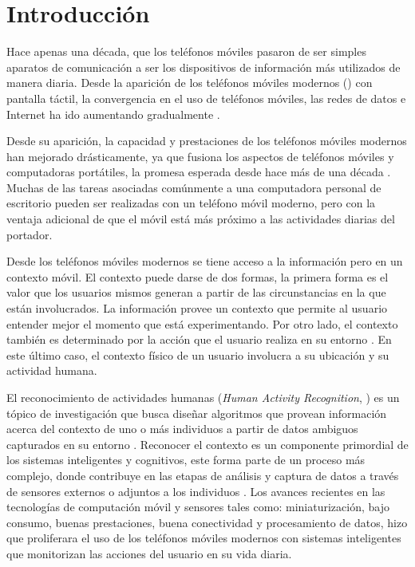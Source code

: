 
\chapter{Introducción}

\label{chap1:introduccion}

Hace apenas una década, que los teléfonos móviles pasaron de ser simples
aparatos de comunicación a ser los dispositivos de información más
utilizados de manera diaria. Desde la aparición de los teléfonos móviles
modernos () con pantalla táctil, la convergencia
en el uso de teléfonos móviles, las redes de datos e Internet ha ido
aumentando gradualmente \cite{Fling2009}.

Desde su aparición, la capacidad y prestaciones de los teléfonos móviles
modernos han mejorado drásticamente, ya que fusiona los aspectos de
teléfonos móviles y computadoras portátiles, la promesa esperada desde
hace más de una década \cite{Tanenbaum2010}. Muchas de las tareas
asociadas comúnmente a una computadora personal de escritorio pueden
ser realizadas con un teléfono móvil moderno, pero con la ventaja
adicional de que el móvil está más próximo a las actividades diarias
del portador.

Desde los teléfonos móviles modernos se tiene acceso a la información
pero en un contexto móvil. El contexto puede darse de dos formas,
la primera forma es el valor que los usuarios mismos generan a partir
de las circunstancias en la que están involucrados. La información
provee un contexto que permite al usuario entender mejor el momento
que está experimentando. Por otro lado, el contexto también es determinado
por la acción que el usuario realiza en su entorno \cite{Fling2009}.
En este último caso, el contexto físico de un usuario involucra a
su ubicación y su actividad humana. 

El reconocimiento de actividades humanas (\emph{Human Activity Recognition},
) es un tópico de investigación que busca diseñar algoritmos
que provean información acerca del contexto de uno o más individuos
a partir de datos ambiguos capturados en su entorno \cite{Bao2004}.
Reconocer el contexto es un componente primordial de los sistemas
inteligentes y cognitivos, este forma parte de un proceso más complejo,
donde contribuye en las etapas de análisis y captura de datos a través
de sensores externos o adjuntos a los individuos \cite{ReyesOrtiz2015,Chen2012}.
Los avances recientes en las tecnologías de computación móvil y sensores
tales como: miniaturización, bajo consumo, buenas prestaciones, buena
conectividad y procesamiento de datos, hizo que proliferara el uso
de los teléfonos móviles modernos con sistemas inteligentes que monitorizan
las acciones del usuario en su vida diaria. 


